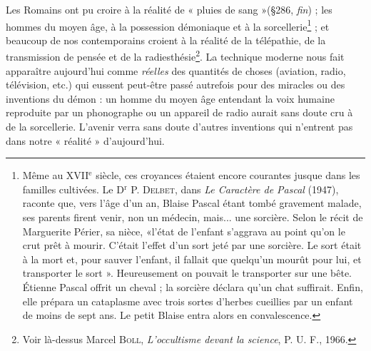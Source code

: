 Les Romains ont pu croire à la réalité de « pluies de sang »(\S 286,
{\it fin}) ; les hommes du moyen âge, à la possession démoniaque et à la
sorcellerie\footnote{Même au {\footnotesize XVII}$^\text{e}$ siècle, ces croyances étaient encore courantes jusque dans les
familles cultivées. Le D$^\text{r}$ P. \textsc{Delbet}, dans {\it Le Caractère de Pascal} (1947), raconte que,
vers l’âge d’un an, Blaise Pascal étant tombé gravement malade, ses parents firent
venir, non un médecin, mais... une sorcière. Selon le récit de Marguerite Périer, sa nièce,
«l’état de l'enfant s’aggrava au point qu’on le crut prêt à mourir. C'était l'effet d’un
sort jeté par une sorcière. Le sort était à la mort et, pour sauver l'enfant, il fallait que
quelqu'un mourût pour lui, et transporter le sort ». Heureusement on pouvait le transporter
sur une bête. Étienne Pascal offrit un cheval ; la sorcière déclara qu'un chat
suffirait. Enfin, elle prépara un cataplasme avec trois sortes d'herbes cueillies par un
enfant de moins de sept ans. Le petit Blaise entra alors en convalescence.} ; et beaucoup de nos contemporains croient à la réalité
de la télépathie, de la transmission de pensée et de la radiesthésie\footnote{Voir là-dessus Marcel \textsc{Boll}, {\it L'occultisme devant la science}, P. U. F., 1966.}.
La technique moderne nous fait apparaître aujourd’hui comme
{\it réelles} des quantités de choses (aviation, radio, télévision, etc.) qui
eussent peut-être passé autrefois pour des miracles ou des inventions
du démon : un homme du moyen âge entendant la voix humaine
reproduite par un phonographe ou un appareil de radio aurait sans
doute cru à de la sorcellerie. L'avenir verra sans doute d’autres inventions
qui n’entrent pas dans notre « réalité » d’aujourd’hui.

